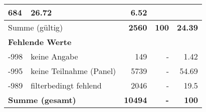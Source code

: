 \begin{longtable}{lXrrr}
       \num{684} &
       \num[round-mode=places,round-precision=2]{26.72} &
         \num[round-mode=places,round-precision=2]{6.52} \\
     \midrule
     \multicolumn{2}{l}{Summe (gültig)} &
       \textbf{\num{2560}} &
     \textbf{\num{100}} &
       \textbf{\num[round-mode=places,round-precision=2]{24.39}} \\
     \multicolumn{5}{l}{\textbf{Fehlende Werte}}\\
       -998 &
       keine Angabe &
         \num{149} &
        - &
         \num[round-mode=places,round-precision=2]{1.42} \\
       -995 &
       keine Teilnahme (Panel) &
         \num{5739} &
        - &
         \num[round-mode=places,round-precision=2]{54.69} \\
       -989 &
       filterbedingt fehlend &
         \num{2046} &
        - &
         \num[round-mode=places,round-precision=2]{19.5} \\
     \midrule
     \multicolumn{2}{l}{\textbf{Summe (gesamt)}} &
          \textbf{\num{10494}} &
        \textbf{-} &
        \textbf{\num{100}} \\
     \bottomrule
     \end{longtable}
     

